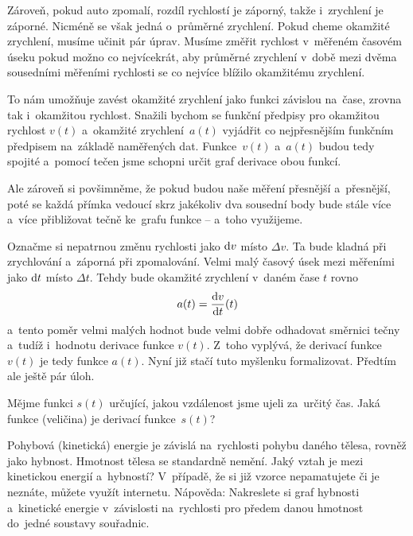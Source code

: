 Zároveň, pokud auto zpomalí, rozdíl rychlostí je záporný, takže i~zrychlení je
záporné. Nicméně se však jedná o~průměrné zrychlení. Pokud cheme okamžité zrychlení,
musíme učinit pár úprav. Musíme změřit rychlost v~měřeném časovém úseku pokud možno
co nejvícekrát, aby průměrné zrychlení v~době mezi dvěma sousedními měřeními
rychlosti se co nejvíce blížilo okamžitému zrychlení.

To nám umožňuje zavést okamžité zrychlení jako funkci závislou na~čase, zrovna tak
i~okamžitou rychlost. Snažili bychom se funkční předpisy pro okamžitou rychlost
$v(t)$ a~okamžité zrychlení~$a(t)$ vyjádřit co nejpřesnějším funkčním předpisem
na~základě naměřených dat. Funkce~$v(t)$ a~$a(t)$ budou tedy spojité a~pomocí tečen
jsme schopni určit graf derivace obou funkcí.

Ale zároveň si povšimněme, že pokud budou naše měření přesnější a~přesnější, poté se
každá přímka vedoucí skrz jakékoliv dva sousední body bude stále více a~více
přibližovat tečně ke~grafu funkce -- a~toho využijeme.

Označme si nepatrnou změnu
rychlosti jako $\mathrm{d} v$ místo $\Delta v$. Ta bude kladná při zrychlování
a~záporná při zpomalování. Velmi malý časový úsek mezi měřeními jako $\mathrm{d} t$
místo $\Delta t$. Tehdy bude okamžité zrychlení v~daném čase $t$ rovno
\begin{equation*}
    a(t) = \frac{\mathrm{d} v}{\mathrm{d} t}(t)
\end{equation*}
a~tento poměr velmi malých hodnot bude velmi dobře odhadovat směrnici tečny a~tudíž
i~hodnotu derivace funkce $v(t)$. Z~toho vyplývá, že derivací funkce $v(t)$ je tedy
funkce $a(t)$. Nyní již stačí tuto myšlenku formalizovat. Předtím ale ještě pár úloh.

\begin{exercise}
    Mějme funkci $s(t)$ určující, jakou vzdálenost jsme ujeli za~určitý čas. Jaká
    funkce (veličina) je derivací funkce~$s(t)$?
\end{exercise}

\begin{exercise}
    Pohybová (kinetická) energie je závislá na~rychlosti pohybu daného tělesa, rovněž
    jako hybnost. Hmotnost tělesa se standardně nemění. Jaký vztah je mezi kinetickou
    energií a~hybností? V~případě, že si již vzorce nepamatujete či je neznáte,
    můžete využít internetu. Nápověda: Nakreslete si graf hybnosti a~kinetické
    energie v~závislosti na~rychlosti pro předem danou hmotnost do~jedné soustavy
    souřadnic.
\end{exercise}

